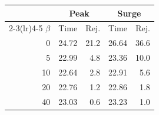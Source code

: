\begin{tabular}{rrrrr}
\toprule
 & \multicolumn{2}{c}{Peak} & \multicolumn{2}{c}{Surge} \\
\cmidrule(lr){2-3}\cmidrule(lr){4-5}
$\beta$ & Time & Rej. & Time & Rej. \\
\midrule
0 & 24.72 & 21.2 & 26.64 & 36.6 \\
5 & 22.99 & 4.8 & 23.36 & 10.0 \\
10 & 22.64 & 2.8 & 22.91 & 5.6 \\
20 & 22.76 & 1.2 & 22.86 & 1.8 \\
40 & 23.03 & 0.6 & 23.23 & 1.0 \\
\bottomrule
\end{tabular}
